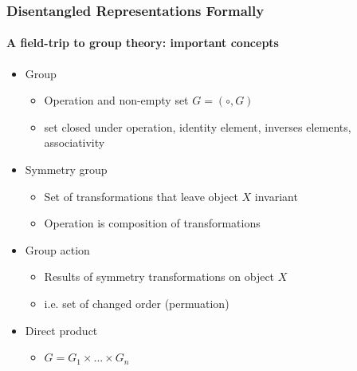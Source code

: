 \documentclass[9pt]{beamer}
\begin{document}
\begin{frame}
\frametitle{Disentangled Representations Formally}
\framesubtitle{A field-trip to group theory: important concepts}
\begin{itemize}%
	\item Group
	\begin{itemize}
		\item Operation and non-empty set $G=(\circ, G)$
		\item set closed under operation, identity element, inverses elements, associativity
	\end{itemize}
	\item Symmetry group
	\begin{itemize}
		\item Set of transformations that leave object $X$ invariant %
		\item Operation is composition of transformations
	\end{itemize}
	\item Group action
	\begin{itemize}
		\item Results of symmetry transformations on object $X$
		\item i.e. set of changed order (permuation)
	\end{itemize}
	\item Direct product
	\begin{itemize}
		\item $G = G_1 \times ... \times G_n$
	\end{itemize}
 \end{itemize}
\end{frame} 
\end{document}
